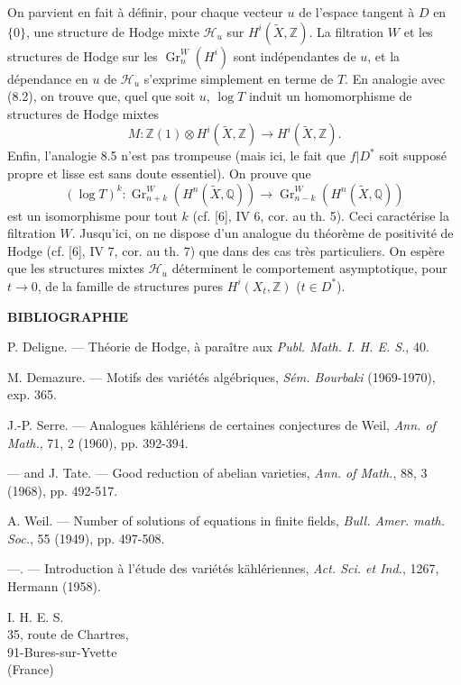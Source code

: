\documentclass[10pt]{article}
\newcommand{\Q}{\mathbb Q}
\newcommand{\Z}{\mathbb Z}
\newcommand{\Gr}{\operatorname{Gr}}
\newcommand{\wt}{\widetilde}
\newcommand{\calH}{\mathcal H}
\begin{document}
On parvient en fait à définir, pour chaque vecteur $u$ de l'espace tangent à $D$ en $\{0\}$, une structure de Hodge mixte $\calH_u$ sur $H^i(\wt X,\Z)$. La filtration $W$ et les structures de Hodge sur les $\Gr_n^W(H^i)$ sont indépendantes de $u$, et la dépendance en $u$ de $\calH_u$ s'exprime simplement en terme de $T$. En analogie avec (8.2), on trouve que, quel que soit $u$, $\log T$ induit un homomorphisme de structures de Hodge mixtes
\[
M:\Z(1)\otimes H^i(\wt X,\Z)\longrightarrow H^i(\wt X,\Z).
\]
Enfin, l'analogie 8.5 n'est pas trompeuse (mais ici, le fait que $f|D^*$ soit supposé propre et lisse est sans doute essentiel). On prouve que
\[
(\log T)^k:\Gr_{n+k}^W(H^n(\wt X,\Q))\longrightarrow\Gr_{n-k}^W(H^n(\wt X,\Q))
\]
est un isomorphisme pour tout $k$ (cf. [6], IV 6, cor. au th. 5). Ceci caractérise la filtration $W$. Jusqu'ici, on ne dispose d'un analogue du théorème de positivité de Hodge (cf. [6], IV 7, cor. au th. 7) que dans des cas très particuliers. On espère que les structures mixtes $\calH_u$ déterminent le comportement asymptotique, pour $t\to0$, de la famille de structures pures $H^i(X_t,\Z)$ ($t\in D^*$).

\begin{center}
\bfseries BIBLIOGRAPHIE
\end{center}
\begin{enumerate}[label={[\arabic*]},leftmargin=2.2em,itemsep=0.1em]
\item P. Deligne. — Théorie de Hodge, à paraître aux \emph{Publ. Math. I. H. E. S.}, 40.
\item M. Demazure. — Motifs des variétés algébriques, \emph{Sém. Bourbaki} (1969-1970), exp. 365.
\item J.-P. Serre. — Analogues kählériens de certaines conjectures de Weil, \emph{Ann. of Math.}, 71, 2 (1960), pp. 392-394.
\item — and J. Tate. — Good reduction of abelian varieties, \emph{Ann. of Math.}, 88, 3 (1968), pp. 492-517.
\item A. Weil. — Number of solutions of equations in finite fields, \emph{Bull. Amer. math. Soc.}, 55 (1949), pp. 497-508.
\item —. — Introduction à l'étude des variétés kählériennes, \emph{Act. Sci. et Ind.}, 1267, Hermann (1958).
\end{enumerate}

\begin{flushleft}
I. H. E. S.\\
35, route de Chartres,\\
91-Bures-sur-Yvette\\
(France)
\end{flushleft}
\end{document}
